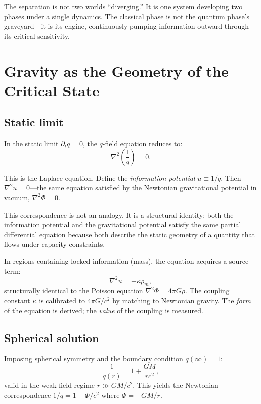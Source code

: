 \documentclass[reprint]{revtex4-2}
\begin{document}
The separation is not two worlds ``diverging.'' It is one system developing two phases under a single dynamics. The classical phase is not the quantum phase's graveyard---it is its engine, continuously pumping information outward through its critical sensitivity.

\section{Gravity as the Geometry of the Critical State}

\subsection{Static limit}

In the static limit $\partial_t q = 0$, the $q$-field equation reduces to:
\begin{equation}
\boxed{\nabla^2\!\left(\frac{1}{q}\right) = 0}.
\label{eq:laplace}
\end{equation}

This is the Laplace equation. Define the \emph{information potential} $u\equiv 1/q$. Then $\nabla^2 u = 0$---the same equation satisfied by the Newtonian gravitational potential in vacuum, $\nabla^2\Phi = 0$.

This correspondence is not an analogy. It is a structural identity: both the information potential and the gravitational potential satisfy the same partial differential equation because both describe the static geometry of a quantity that flows under capacity constraints.

In regions containing locked information (mass), the equation acquires a source term:
\begin{equation}
\nabla^2 u = -\kappa\rho_m,
\label{eq:poisson}
\end{equation}
structurally identical to the Poisson equation $\nabla^2\Phi = 4\pi G\rho$. The coupling constant $\kappa$ is calibrated to $4\pi G/c^2$ by matching to Newtonian gravity. The \emph{form} of the equation is derived; the \emph{value} of the coupling is measured.

\subsection{Spherical solution}

Imposing spherical symmetry and the boundary condition $q(\infty)=1$:
\begin{equation}
\boxed{\frac{1}{q(r)} = 1 + \frac{GM}{rc^2}},
\label{eq:spherical}
\end{equation}
valid in the weak-field regime $r\gg GM/c^2$. This yields the Newtonian correspondence $1/q = 1 - \Phi/c^2$ where $\Phi = -GM/r$.
\end{document}
